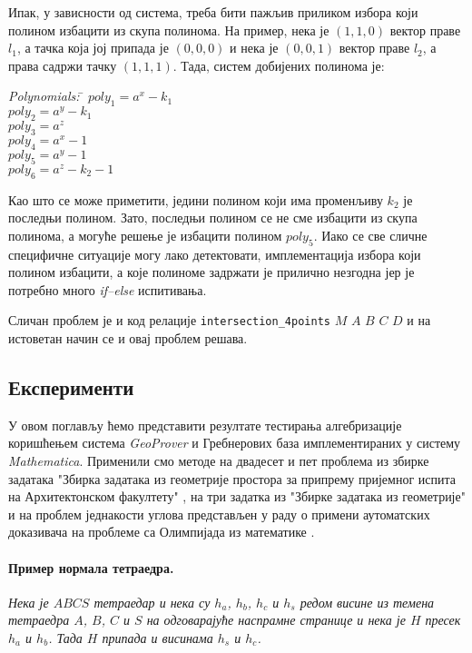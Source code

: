 Ипак, у зависности од система, треба бити пажљив приликом избора који
полином избацити из скупа полинома. На пример, нека је $(1, 1, 0)$
вектор праве $l_1$, а тачка која јој припада је $(0, 0, 0)$ и нека је
$(0, 0, 1)$ вектор праве $l_2$, а права садржи тачку $(1, 1,
1)$. Тада, систем добијених полинома је:
\begin{tabbing}
{\em Polynomials:} \= $poly_1 = a^x - k_1$ \\
                   \> $poly_2 = a^y - k_1$ \\
                   \> $poly_3 = a^z$ \\
                   \> $poly_4 = a^x - 1$ \\
                   \> $poly_5 = a^y - 1$ \\
                   \> $poly_6 = a^z - k_2 - 1$
\end{tabbing}

Као што се може приметити, једини полином који има променљиву $k_2$ је
последњи полином. Зато, последњи полином се не сме избацити из скупа
полинома, а могуће решење је избацити полином $poly_5$. Иако се све
сличне специфичне ситуације могу лако детектовати, имплементација
избора који полином избацити, а које полиноме задржати је прилично
незгодна јер је потребно много \emph{if--else} испитивања.

Сличан проблем је и код релације {\tt intersection\_4points} $M$ $A$
$B$ $C$ $D$ и на истоветан начин се и овај проблем решава.

\subsection{Експерименти}

У овом поглављу ћемо представити резултате тестирања алгебризације
коришћењем система \emph{GeoProver} и Гребнерових база имплементираних
у систему \emph{Mathematica}. Применили смо методе на двадесет и пет
проблема из збирке задатака "Збирка задатака из геометрије простора за
припрему пријемног испита на Архитектонском факултету"
\cite{zbirkaArhitektura}, на три задатка из "Збирке задатака из
геометрије" \cite{janicic1997zbirka} и на проблем једнакости углова
представљен у раду о примени аутоматских доказивача на проблеме са
Олимпијада из математике \cite{shao2016challenging}.

\paragraph{Пример нормала тетраедра.} \emph{Нека је $ABCS$ тетраедар и нека 
су $h_a$, $h_b$, $h_c$ и $h_s$ редом висине из темена тетраедра $A$,
$B$, $C$ и $S$ на одговарајуће наспрамне странице и нека је $H$ пресек
$h_a$ и $h_b$. Тада $H$ припада и висинама $h_s$ и $h_c$. }

